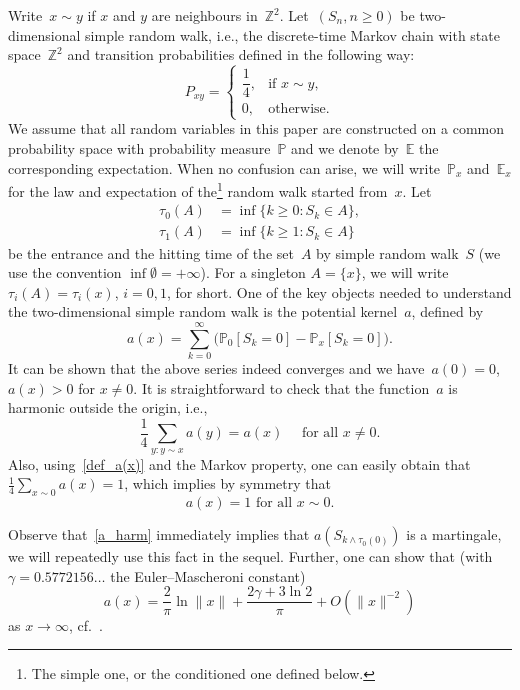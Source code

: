 \documentclass[10pt]{amsart}
\theoremstyle{definition}\newtheorem{defi}[theo]{Definition}\newtheorem{rema}[theo]{Remark}\newtheorem{exam}[theo]{Example}\newtheorem{exem}[theo]{Example}\newtheorem{nota}[theo]{Notation}
\newcommand{\1}[1]{{\mathbf 1}{\{#1\}}}
\newcommand{\Z}{\mathbb{Z}}
\newcommand{\8}{{\infty}}
\newcommand{\IP}{{\mathbb P}}
\newcommand{\IE}{{\mathbb E}}
\begin{document}
Write~$x\sim y$ if $x$ and $y$ are neighbours in~$\Z^2$. Let~$(S_n, n\geq 0)$ be two-dimensional simple random walk, i.e., the discrete-time Markov chain with state space~$\Z^2$ and transition probabilities defined in the following way:
\begin{equation}\label{def_S}
P_{xy} =
\begin{cases}
\dfrac{1}{4}, & \text{if }x\sim y,\\[0.6em]
0, & \text{otherwise}.
\end{cases}
\end{equation}
We assume that all random variables in this paper are constructed on a common probability space with probability measure~$\IP$ and we denote by~$\IE$ the corresponding expectation. When no confusion can arise, we will write~$\IP_x$ and~$\IE_x$ for the law and expectation of the\footnote{The simple one, or the conditioned one defined below.} random walk started from~$x$. Let
\begin{align}
\tau_0(A) &= \inf\{k\geq 0: S_k\in A\} \label{entrance_t},\\
\tau_1(A) &= \inf\{k\geq 1: S_k\in A\} \label{hitting_t}
\end{align}
be the entrance and the hitting time of the set~$A$ by simple random walk~$S$ (we use the convention $\inf \emptyset = +\8$). For a singleton $A=\{x\}$, we will write $\tau_i(A)=\tau_i(x)$, $i=0,1$, for short. One of the key objects needed to understand the two-dimensional simple random walk is the potential kernel~$a$, defined by
\begin{equation}\label{def_a(x)}
a(x) = \sum_{k=0}^\infty\big(\IP_0[S_k\!=\!0]-\IP_x[S_k\!=\!0]\big).
\end{equation}
It can be shown that the above series indeed converges and we have~$a(0)=0$, $a(x)>0$ for $x\neq 0$. It is straightforward to check that the function~$a$ is harmonic outside the origin, i.e.,
\begin{equation}\label{a_harm}
\frac{1}{4}\sum_{y: y\sim x}a(y) = a(x) \quad \text{ for all } x\neq 0.
\end{equation}
Also, using~\eqref{def_a(x)} and the Markov property, one can easily obtain that $\frac{1}{4}\sum_{x\sim 0}a(x)=1$, which implies by symmetry that
\begin{equation}\label{a(x)=1}
a(x)=1 \text{ for all }x\sim 0.
\end{equation}

Observe that~\eqref{a_harm} immediately implies that $a(S_{k\wedge \tau_0(0)})$ is a martingale, we will repeatedly use this fact in the sequel. Further, one can show that (with $\gamma=0.5772156\dots$ the Euler--Mascheroni constant)
\begin{equation}\label{formula_for_a}
a(x) = \frac{2}{\pi}\ln \|x\| + \frac{2\gamma+ 3\ln 2}{\pi} + O(\|x\|^{-2})
\end{equation}
as $x\to\infty$, cf.~\cite[Theorem~4.4.4]{LL10}.
\end{document}
